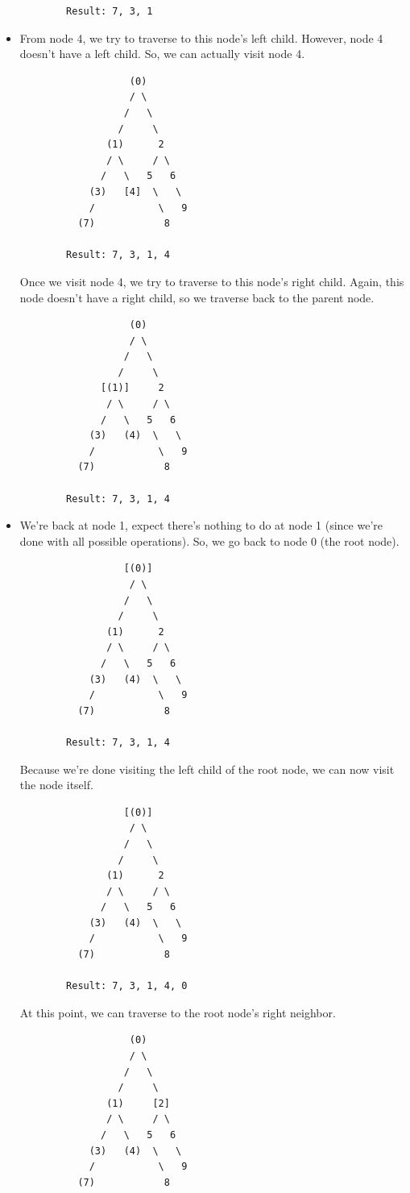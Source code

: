 \documentclass[letterpaper]{article}
\begin{document}
\begin{itemize}
\begin{verbatim}
        Result: 7, 3, 1 
    \end{verbatim}

    \item From node 4, we try to traverse to this node's left child. However, node 4 doesn't have a left child. So, we can actually visit node 4. 
    \begin{verbatim}
                   (0)
                   / \
                  /   \
                 /     \
               (1)      2 
               / \     / \ 
              /   \   5   6
            (3)   [4]  \   \ 
            /           \   9
          (7)            8

        Result: 7, 3, 1, 4 
    \end{verbatim}
    Once we visit node 4, we try to traverse to this node's right child. Again, this node doesn't have a right child, so we traverse back to the parent node. 
    \begin{verbatim}
                   (0)
                   / \
                  /   \
                 /     \
              [(1)]     2 
               / \     / \ 
              /   \   5   6
            (3)   (4)  \   \ 
            /           \   9
          (7)            8

        Result: 7, 3, 1, 4
    \end{verbatim}

    \item We're back at node 1, expect there's nothing to do at node 1 (since we're done with all possible operations). So, we go back to node 0 (the root node). 
    \begin{verbatim}
                  [(0)]
                   / \
                  /   \
                 /     \
               (1)      2 
               / \     / \ 
              /   \   5   6
            (3)   (4)  \   \ 
            /           \   9
          (7)            8

        Result: 7, 3, 1, 4
    \end{verbatim}

    Because we're done visiting the left child of the root node, we can now visit the node itself. 
    \begin{verbatim}
                  [(0)]
                   / \
                  /   \
                 /     \
               (1)      2 
               / \     / \ 
              /   \   5   6
            (3)   (4)  \   \ 
            /           \   9
          (7)            8

        Result: 7, 3, 1, 4, 0
    \end{verbatim}
    At this point, we can traverse to the root node's right neighbor. 
    \begin{verbatim}
                   (0)
                   / \
                  /   \
                 /     \
               (1)     [2] 
               / \     / \ 
              /   \   5   6
            (3)   (4)  \   \ 
            /           \   9
          (7)            8


\end{verbatim}
\end{itemize}
\end{document}
